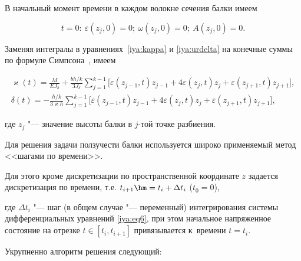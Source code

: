 

В начальный момент времени в каждом волокне сечения балки имеем

\begin{equation*}

	t=0:\	\varepsilon(z_{j},0)=0; \ \omega(z_{j},0)=0; \ A(z_{j},0)=0.  

		\end{equation*}

  Заменяя интегралы  в уравнениях~\eqref{iya:kappa} и \eqref{iya:urdelta} на конечные суммы по формуле Симпсона~\cite{iya:Simpson}, имеем    

\begin{equation}

\begin{array}{l}

\displaystyle

\varkappa(t)=\frac{M}{E  J_{\delta}} +\frac{b  h/k}{3  J_{\delta}}\sum\limits_{j=1}^{k-1} 

\bigl[\varepsilon(z_{j-1},t)z_{j-1}+ 4  \varepsilon(z_{j},t)z_{j}+\varepsilon(z_{j+1},t)z_{j+1}\bigr],

\\

\displaystyle

\delta(t)=- \frac{ h/k}{3 \varkappa h}\sum\limits_{j=1}^{k-1}

\bigl[\varepsilon(z_{j-1},t)z_{j-1}+ 4  \varepsilon(z_{j},t)z_{j}+\varepsilon(z_{j+1},t)z_{j+1}\bigr],

\end{array}

\label{iya:eq7}

\end{equation}

 где $z_{j}$ "--- значение высоты балки в $j$-той точке разбиения.

 

Для решения задачи ползучести балки используется широко применяемый метод <<шагами по времени>>. 

Для этого кроме дискретизации по пространственной координате $z$ задается дискретизация по времени, т.е. $t_{i+1}\hm =t_i+\Delta t_i$ ($t_0=0$), 

где $\Delta t_i$ "--- шаг (в общем случае "--- переменный) интегрирования системы дифференциальных уравнений \eqref{iya:eq6}, при этом начальное напряженное состояние на отрезке $t\in[t_i,t_{i+1}]$ привязывается к~времени $t=t_i$. 

Укрупненно алгоритм решения следующий: 

